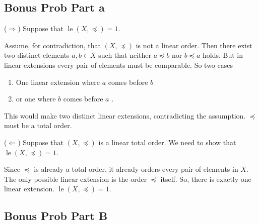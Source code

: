 \documentclass{report}
\begin{document}

\subsection*{Bonus Prob Part a}

\begin{proofWithHibiscus}
  (\(\Rightarrow\)) Suppose that $\operatorname{le}(X, \preceq) = 1$. 

  \bigskip
  
  Assume, for contradiction, that $(X, \preceq)$ is not a linear order. Then there exist two distinct elements 
  $a, b \in X$ such that neither $a \preceq b$ nor $b \preceq a$ holds. But in linear extensions every pair of elements must be comparable. So two cases 
  \begin{enumerate}
    \item One linear extension where $a$ comes before $b$ 
    \item or one where $b$ comes before $a$ .
  \end{enumerate}
  This would make two distinct linear extensions, contradicting the assumption. $\preceq$ must be a total order.

  \bigskip
  
  (\(\Leftarrow\)) Suppose that $(X, \preceq)$ is a linear total order. We need to show that $\operatorname{le}(X, \preceq) = 1$.

  \bigskip
  
  Since $\preceq$ is already a total order, it already orders every pair of elements in $X$. The only possible linear extension is the order $\preceq$ itself. So, there is exactly one linear extension. $\operatorname{le}(X, \preceq) = 1$.
\end{proofWithHibiscus}

\subsection*{Bonus Prob Part B}
\end{document}
